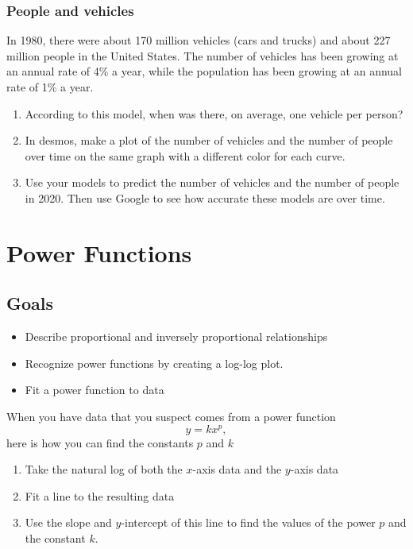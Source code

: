 \documentclass[
]{book}
\providecommand{\tightlist}{%
  \setlength{\itemsep}{0pt}\setlength{\parskip}{0pt}}
\begin{document}
\hypertarget{people-and-vehicles}{%
\subsection{People and vehicles}\label{people-and-vehicles}}

In 1980, there were about 170 million vehicles (cars and trucks) and about 227 million people in the United States. The number of vehicles has been growing at an annual rate of 4\% a year, while the population has been growing at an annual rate of 1\% a year.

\begin{enumerate}
\def\labelenumi{\arabic{enumi}.}
\item
  According to this model, when was there, on average, one vehicle per person?
\item
  In desmos, make a plot of the number of vehicles and the number of people over time on the same graph with a different color for each curve.
\item
  Use your models to predict the number of vehicles and the number of people in 2020. Then use Google to see how accurate these models are over time.
\end{enumerate}

\hypertarget{power-functions}{%
\chapter{Power Functions}\label{power-functions}}

\hypertarget{goals-4}{%
\section{Goals}\label{goals-4}}

\begin{itemize}
\tightlist
\item
  Describe proportional and inversely proportional relationships
\item
  Recognize power functions by creating a log-log plot.
\item
  Fit a power function to data
\end{itemize}

When you have data that you suspect comes from a power function
\[y=k x^p,\]
here is how you can find the constants \(p\) and \(k\)

\begin{enumerate}
\def\labelenumi{\arabic{enumi}.}
\tightlist
\item
  Take the natural log of both the \(x\)-axis data and the \(y\)-axis data
\item
  Fit a line to the resulting data
\item
  Use the slope and \(y\)-intercept of this line to find the values of the power \(p\) and the constant \(k\).
\end{enumerate}
\end{document}
